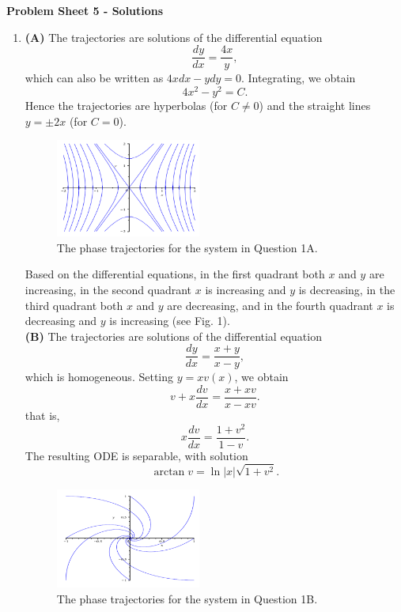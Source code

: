 \documentclass[11pt,a4paper]{article}
\begin{document}
	\begin{center}
		\textbf{Problem Sheet 5 - Solutions}
	\end{center}
	\begin{enumerate}
		\item \textbf{(A)} The trajectories are solutions of the differential equation
		$$
		\frac{dy}{dx} = \frac{4x}{y},
		$$
		which can also be written as $4xdx - ydy = 0$. Integrating, we obtain
		$$
		4x^2 - y^2 = C.
		$$
		Hence the trajectories are hyperbolas (for $C \neq 0$) and the straight lines $y = \pm 2x$ (for $C = 0$).
		\begin{figure}[H]
			\centering
			\includegraphics[width=0.45\textwidth]{figure/6_fig1.PNG}
			\caption{The phase trajectories for the system in Question 1A.}
		\end{figure}
		Based on the differential equations, in the first quadrant both $x$ and $y$ are increasing, in the second quadrant $x$ is increasing and $y$ is decreasing, in the third quadrant both $x$ and $y$ are decreasing, and in the fourth quadrant $x$ is decreasing and $y$ is increasing (see Fig. 1).\\
		\textbf{(B)} The trajectories are solutions of the differential equation
		$$
		\frac{dy}{dx} = \frac{x+y}{x-y},
		$$
		which is homogeneous. Setting $y = xv(x)$, we obtain
		$$
		v + x\frac{dv}{dx} = \frac{x + xv}{x - xv}.
		$$
		that is,
		$$
		x\frac{dv}{dx} = \frac{1 + v^2}{1 - v}.
		$$
		The resulting ODE is separable, with solution
		$$
		\arctan v = \ln|x|\sqrt{1 + v^2}.
		$$
		\begin{figure}[H]
			\centering
			\includegraphics[width=0.45\textwidth]{figure/6_fig2.PNG}
			\caption{The phase trajectories for the system in Question 1B.}

\end{figure}
\end{enumerate}
\end{document}
